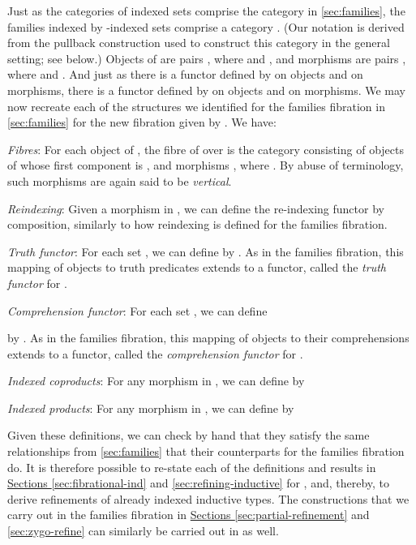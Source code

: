 \documentclass{LMCS}
\begin{document}
Just as the categories of indexed sets comprise the category
 in \autoref{sec:families}, the families indexed by
-indexed sets comprise a category . (Our notation is derived from the pullback construction
used to construct this category in the general setting; see below.)
Objects of  are pairs ,
where  and , and morphisms
are pairs , where  and .
And just as there is a functor  defined by
 on objects and  on morphisms, there is a
functor 
defined by  on objects and  on
morphisms. We may now recreate each of the structures we identified
for the families fibration in \autoref{sec:families} for the new
fibration given by . We have:
\begin{iteMize}{}
\item {\em Fibres}: For each object  of , the fibre
  of  over  is the
  category  consisting of
  objects of  whose first
  component is , and morphisms , where . By abuse of terminology, such morphisms are again said
  to be \emph{vertical}.
\item {\em Reindexing}: Given a morphism  in
  , we can define the re-indexing functor  by composition, similarly to how
  reindexing is defined for the families fibration.
\item {\em Truth functor}: For each set , we can define  by
  . As in the families fibration,
  this mapping of objects to truth predicates extends to a functor,
  called the {\em truth functor} for .
\item {\em Comprehension functor}: For each set , we can define
  
  by . As in
  the families fibration, this mapping of objects to their
  comprehensions extends to a functor, called the {\em comprehension
    functor} for .
\item {\em Indexed coproducts}: For any morphism  in
  , we can define  by
  
\item {\em Indexed products}: For any morphism  in
  , we can define  by
  
\end{iteMize}
\noindent
Given these definitions, we can check by hand that they satisfy the
same relationships from \autoref{sec:families} that their counterparts
for the families fibration do. It is therefore possible to re-state
each of the definitions and results in
\hyperref[sec:fibrational-ind]{Sections \ref*{sec:fibrational-ind}}
and \hyperref[sec:refining-inductive]{ \ref*{sec:refining-inductive}}
for , and, thereby, to derive refinements of already indexed
inductive types. The constructions that we carry out in the families
fibration in \hyperref[sec:partial-refinement]{Sections
  \ref*{sec:partial-refinement}} and \hyperref[sec:zygo-refine]{
  \ref*{sec:zygo-refine}} can similarly be carried out in  as
well.
\end{document}
